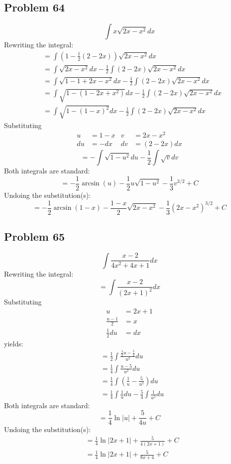 \documentclass{article}
\begin{document}
\subsection*{Problem 64}
$$\int x\sqrt{2x-x^2}dx$$
Rewriting the integral:
\begin{align*}
&=\int\left(1-\frac{1}{2}(2-2x)\right)\sqrt{2x-x^2}dx \\
&=\int\sqrt{2x-x^2}dx-\frac{1}{2}\int(2-2x)\sqrt{2x-x^2}dx \\
&=\int\sqrt{1-1+2x-x^2}dx-\frac{1}{2}\int(2-2x)\sqrt{2x-x^2}dx \\
&=\int\sqrt{1-(1-2x+x^2)}dx-\frac{1}{2}\int(2-2x)\sqrt{2x-x^2}dx \\
&=\int\sqrt{1-(1-x)^2}dx-\frac{1}{2}\int(2-2x)\sqrt{2x-x^2}dx
\end{align*}
Substituting
\begin{align*}
u&=1-x &v&=2x-x^2 \\
du&=-dx &dv&=(2-2x)dx
\end{align*}
$$=-\int\sqrt{1-u^2}du-\frac{1}{2}\int\sqrt{v}dv$$
Both integrals are standard:
$$=-\frac{1}{2}\arcsin(u)-\frac{1}{2}u\sqrt{1-u^2}-\frac{1}{3}v^{3/2}+C$$
Undoing the substitution(s):
$$=-\frac{1}{2}\arcsin(1-x)-\frac{1-x}{2}\sqrt{2x-x^2}-\frac{1}{3}(2x-x^2)^{3/2}+C$$
\subsection*{Problem 65}
$$\int\frac{x-2}{4x^2+4x+1}dx$$
Rewriting the integral:
$$=\int\frac{x-2}{(2x+1)^2}dx$$
Substituting
\begin{align*}
u&=2x+1 \\
\frac{u-1}{2}&=x \\
\frac{1}{2}du&=dx
\end{align*}
yields:
\begin{align*}
&=\frac{1}{2}\int\frac{\frac{1}{2}u-\frac{5}{2}}{u^2}du \\
&=\frac{1}{4}\int\frac{u-5}{u^2}du \\
&=\frac{1}{4}\int\left(\frac{1}{u}-\frac{5}{u^2}\right)du \\
&=\frac{1}{4}\int\frac{1}{u}du-\frac{5}{4}\int\frac{1}{u^2}du
\end{align*}
Both integrals are standard:
$$=\frac{1}{4}\ln|u|+\frac{5}{4u}+C$$
Undoing the substitution(s):
\begin{align*}
&=\frac{1}{4}\ln|2x+1|+\frac{5}{4(2x+1)}+C \\
&=\frac{1}{4}\ln|2x+1|+\frac{5}{8x+4}+C
\end{align*}
\end{document}
